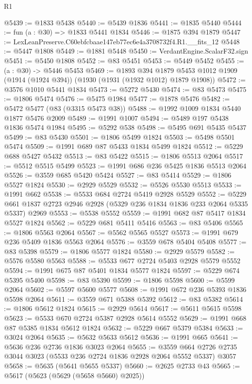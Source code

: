 \begin{lexlean}{R1}
\begin{coremodule}
@5439 := @1833 @5438
@5440 := @5439 @1836
@5441 := @1835 @5440
@5444 := fun (a : @30) => @1833 @5441 @1834
@5446 := @1875 @394 @1879
@5447 := LexLeanPreserve.C60ebfcbaae147eb77ec6e4a3708732f4.R1.__fits_12
@5448 := @5447 @1808
@5449 := @1881 @5448
@5450 := VerdantEngine.ScalarF32.sign
@5451 := @5450 @1808
@5452 := @83 @5451
@5453 := @5449 @5452
@5455 := (a : @30) -> @5446 @5453
@5469 := @1893
    @394
    @1879
    @5453
    @1012
    @1909
    (@1914 (@1924 @394))
    (@1930 (@1931 (@1932 @1012) @1879 @1908))
@5472 := @3576 @1010 @5441 @1834
@5473 := @5272 @5430
@5474 := @83 @5473
@5475 := @1806 @5474
@5476 := @5475 @1984
@5477 := @1878 @5476
@5482 := @5472 @5477 (@83 (@3315 @5473 @38))
@5488 := @1992 @1009 @1834 @5440 @1877 @5476 @2009
@5489 := @1991 @1007
@5494 := @5489 @197 @5438 @1836 @5474 @1984
@5495 := @5292 @538
@5498 := @5495 @691 @5435 @5437
@5499 := @83 @5430
@5501 := @1806 @5499 @1824
@5503 := @5498 @5501 @5474
@5509 := @1991 @689 @87 @5433 @1834 @5499 @1824
@5512 := @5229 @688 @5427 @5432
@5513 := @83 @5422
@5515 := @1806 @5513 @2064
@5517 := @5512 @5515 @5499
@5523 := @1991 @686 @236 @5425 @1836 @5513 @2064
@5526 := @3559 @685 @5420 @5424
@5527 := @83 @5414
@5529 := @1806 @5527 @1824
@5530 := @2929 @5529
@5532 := @5526 @5530 @5513
@5533 := @1991 @662
@5538 := @5533 @684 @2724 @5419 @2928 @5529
@5552 := @5229 @661 @1837 @2723 @2946 @2928 (@5329 @236 @1834 @1836 @233 @2064 @5335 @5337) @2969
@5553 := @5538 @5552
@5559 := @1991 @682 @87 @5417 @1834 @5527 @1824
@5562 := @5229 @681 @5411 @5416
@5563 := @83 @5406
@5565 := @1806 @5563 @2064
@5567 := @5562 @5565 @5527
@5573 := @1991 @679 @236 @5409 @1836 @5563 @2064
@5576 := @3559 @678 @5404 @5408
@5577 := @83 @5398
@5579 := @1806 @5577 @1824
@5580 := @2929 @5579
@5582 := @5576 @5580 @5563
@5588 := @5533 @677 @2724 @5403 @2928 @5579 @5552
@5594 := @1991 @675 @87 @5401 @1834 @5577 @1824
@5597 := @5229 @674 @5395 @5400
@5598 := @83 @5390
@5599 := @1806 @5598
@5600 := @5599 @2064
@5602 := @5597 @5600 @5577
@5608 := @1991 @672 @236 @5393 @1836 @5598 @2064
@5611 := @3559 @671 @5388 @5392
@5612 := @83 @5382
@5614 := @1806 @5612 @1824
@5615 := @2929 @5614
@5617 := @5611 @5615 @5598
@5623 := @5533 @670 @2724 @5387 @2928 @5614 @5552
@5629 := @1991 @668 @87 @5385 @1834 @5612 @1824
@5632 := @5229 @667 @5379 @5384
@5633 := @3024 @2064
@5635 := @5632 @5633 @5612
@5636 := @1991 @665
@5641 := @5636 @236 @2736 @1836 @3023 @2064
@5655 := @3559 @664 @2726 @2735 @3044 @3023 (@5533 @236 @2724 @1836 @2928 @2064 @5552 @5337) @3057
@5658 := @5635 (@5641 @5655 @5337)
@5660 := @2625 @2733 @43
@5665 := @5617 (@5623 (@5629 (@5658 @5660) @2025))

\end{coremodule}
\end{lexlean}
